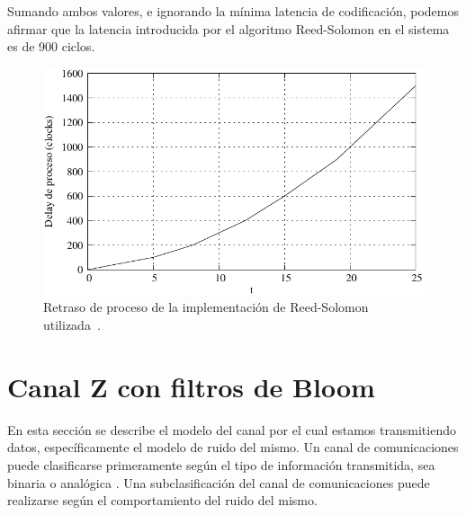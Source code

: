 Sumando ambos valores, e ignorando la mínima latencia de codificación, podemos afirmar que la latencia introducida por el algoritmo Reed-Solomon en el sistema es de 900 ciclos.

\begin{figure}[t]
  \centering
  \includegraphics[width=0.8 \textwidth]{graphs/rsDelay.pdf} 
  \caption{Retraso de proceso de la implementación de Reed-Solomon utilizada~\cite{Xilinx:DS252}.}
  \label{fig_rslat}
\end{figure}


% 

\section{Canal Z con filtros de Bloom}

En esta sección se describe el modelo del canal por el cual estamos transmitiendo datos, específicamente el modelo de ruido del mismo. 
Un canal de comunicaciones puede clasificarse primeramente según el tipo de información transmitida, sea binaria o analógica \cite{MacKay:2002}.
Una subclasificación del canal de comunicaciones puede realizarse según el comportamiento del ruido del mismo.

